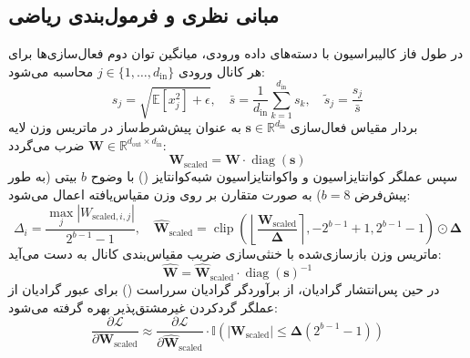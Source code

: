\subsection{مبانی نظری و فرمول‌بندی ریاضی}
در طول فاز کالیبراسیون با دسته‌های داده ورودی، میانگین توان دوم فعال‌سازی‌ها برای هر کانال ورودی $j \in \{1, \dots, d_{\text{in}}\}$ محاسبه می‌شود:
\begin{equation}
s_j = \sqrt{\mathbb{E}[x_j^2] + \epsilon}, \quad \bar{s} = \frac{1}{d_{\text{in}}} \sum_{k=1}^{d_{\text{in}}} s_k, \quad \tilde{s}_j = \frac{s_j}{\bar{s}}
\end{equation}
بردار مقیاس فعال‌سازی $\mathbf{s} \in \mathbb{R}^{d_{\text{in}}}$ به عنوان پیش‌شرط‌ساز در ماتریس وزن لایه $\mathbf{W} \in \mathbb{R}^{d_{\text{out}} \times d_{\text{in}}}$ ضرب می‌گردد:
\begin{equation}
\mathbf{W}_{\text{scaled}} = \mathbf{W} \cdot \operatorname{diag}(\mathbf{s})
\end{equation}
سپس عملگر کوانتایزاسیون و واکوانتایزاسیون شبه‌کوانتایز () با وضوح $b$ بیتی (به طور پیش‌فرض $b=8$) به صورت متقارن بر روی وزن مقیاس‌یافته اعمال می‌شود:
\begin{equation}
\Delta_i = \frac{\max_j |W_{\text{scaled}, i, j}|}{2^{b-1} - 1}, \quad \widehat{\mathbf{W}}_{\text{scaled}} = \operatorname{clip}\left(\left\lfloor \frac{\mathbf{W}_{\text{scaled}}}{\mathbf{\Delta}} \right\rceil, -2^{b-1}+1, 2^{b-1}-1\right) \odot \mathbf{\Delta}
\end{equation}
ماتریس وزن بازسازی‌شده با خنثی‌سازی ضریب مقیاس‌بندی کانال به دست می‌آید:
\begin{equation}
\widehat{\mathbf{W}} = \widehat{\mathbf{W}}_{\text{scaled}} \cdot \operatorname{diag}(\mathbf{s})^{-1}
\end{equation}
در حین پس‌انتشار گرادیان، از برآوردگر گرادیان سرراست () برای عبور گرادیان از عملگر گردکردن غیرمشتق‌پذیر بهره گرفته می‌شود:
\begin{equation}
\frac{\partial \mathcal{L}}{\partial \mathbf{W}_{\text{scaled}}} \approx \frac{\partial \mathcal{L}}{\partial \widehat{\mathbf{W}}_{\text{scaled}}} \cdot \mathbb{I}\left(|\mathbf{W}_{\text{scaled}}| \le \mathbf{\Delta} (2^{b-1}-1)\right)
\end{equation}

